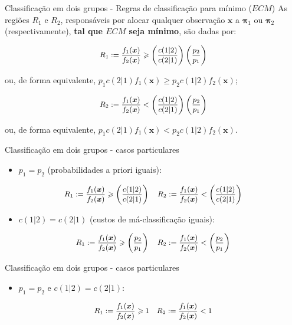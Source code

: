 \documentclass[
  ignorenonframetext,
  aspectratio=169,
]{beamer}
\providecommand{\tightlist}{%
  \setlength{\itemsep}{0pt}\setlength{\parskip}{0pt}}
\begin{document}
\begin{frame}{Classificação em dois grupos - Regras de classificação
para mínimo (\(ECM\))}
\label{classificauxe7uxe3o-em-dois-grupos---regras-de-classificauxe7uxe3o-para-muxednimo-ecm}
As regiões \(R_1\) e \(R_2\), responsáveis por alocar qualquer
observação \(\boldsymbol{x}\) a \(\boldsymbol{\pi}_1\) ou
\(\boldsymbol{\pi}_2\) (respectivamente), \textbf{tal que \(ECM\) seja
mínimo}, são dadas por:

\[\small R_1: = \dfrac{f_1(\boldsymbol{x})}{f_2(\boldsymbol{x})} \geqslant \left( \dfrac{c(1|2)}{c(2|1)}\right) \left( \dfrac{p_2}{p_1}\right)\]

ou, de forma equivalente,
\(p_1c(2|1)f_1(\boldsymbol{x}) \geqslant p_2c(1|2)f_2(\boldsymbol{x})\);

\[\small R_2: = \dfrac{f_1(\boldsymbol{x})}{f_2(\boldsymbol{x})} < \left( \dfrac{c(1|2)}{c(2|1)}\right) \left( \dfrac{p_2}{p_1}\right)\]

ou, de forma equivalente,
\(p_1c(2|1)f_1(\boldsymbol{x}) < p_2c(1|2)f_2(\boldsymbol{x})\).
\end{frame}

\begin{frame}{Classificação em dois grupos - casos particulares}
\label{classificauxe7uxe3o-em-dois-grupos---casos-particulares}
\begin{itemize}
\tightlist
\item
  \(p_1 = p_2\) (probabilidades a priori iguais):
\end{itemize}

\[\small R_1: = \dfrac{f_1(\boldsymbol{x})}{f_2(\boldsymbol{x})} \geqslant \left( \dfrac{c(1|2)}{c(2|1)}\right) \,\,\,\,\,\, R_2: = \dfrac{f_1(\boldsymbol{x})}{f_2(\boldsymbol{x})} < \left( \dfrac{c(1|2)}{c(2|1)}\right)\]

\begin{itemize}
\tightlist
\item
  \(c(1|2) = c(2|1)\) (custos de má-classificação iguais):
\end{itemize}

\[\small R_1: = \dfrac{f_1(\boldsymbol{x})}{f_2(\boldsymbol{x})} \geqslant \left( \dfrac{p_2}{p_1}\right) \,\,\,\,\,\, R_2: = \dfrac{f_1(\boldsymbol{x})}{f_2(\boldsymbol{x})} < \left( \dfrac{p_2}{p_1}\right)\]
\end{frame}

\begin{frame}{Classificação em dois grupos - casos particulares}
\label{classificauxe7uxe3o-em-dois-grupos---casos-particulares-1}
\begin{itemize}
\tightlist
\item
  \(p_1 = p_2\) e \(c(1|2) = c(2|1)\):
\end{itemize}

\[\small R_1: = \dfrac{f_1(\boldsymbol{x})}{f_2(\boldsymbol{x})} \geqslant 1 \,\,\,\,\,\, R_2: = \dfrac{f_1(\boldsymbol{x})}{f_2(\boldsymbol{x})} < 1\]
\end{frame}
\end{document}
